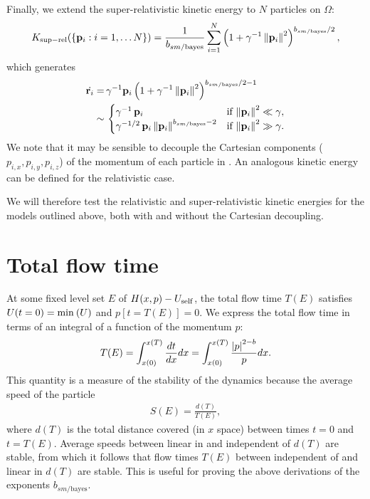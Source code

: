 \documentclass[a4paper]{article}
\begin{document}
Finally, we extend the super-relativistic kinetic energy to $N$ particles on $\Omega$:
\begin{align} \label{eq:RelKEManyParticles}
K_{\rm sup-rel}(\{ \mathbf{p}_i : i = 1, \dots N \}) = \frac{1}{b_{sm / \text{bayes}}} \sum_{i = 1}^N \left( 1 + \gamma^{-1} \left\lVert \mathbf{p}_i \right\rVert^2 \right)^{b_{sm / \text{bayes}} / 2} ,
\end{align}
which generates
\begin{align}
\dot{\mathbf{r}_i} =& \, \gamma^{-1} \mathbf{p}_i \left( 1 + \gamma^{-1} \left\lVert \mathbf{p}_i \right\rVert^2 \right)^{b_{sm / \text{bayes}} / 2 - 1} \nonumber \\
\sim & \,
\begin{cases} 
\gamma^{-1} \, \mathbf{p}_i &\text{if} \, \left\lVert \mathbf{p}_i \right\rVert^2 \ll \gamma , \\
\gamma^{-1 / 2} \, \mathbf{p}_i \left\lVert \mathbf{p}_i \right\rVert^{b_{sm / \text{bayes}} - 2} &\text{if} \, \left\lVert \mathbf{p}_i \right\rVert^2 \gg \gamma .
\end{cases} 
\end{align}
We note that it may be sensible to decouple the Cartesian components ($p_{i, x}, p_{i, y}, p_{i, z}$) of the momentum of each particle in . An analogous kinetic energy can be defined for the relativistic case. 

We will therefore test the relativistic and super-relativistic kinetic energies for the models outlined above, both with and without the Cartesian decoupling. 



\section{Total flow time}

At some fixed level set $E$ of $H(x, p) - U_{\rm{self}}$, the total flow time $T(E)$ satisfies $U(t = 0) = \min^{} \left( U \right)$ and $p[t = T(E)] = 0$. We express the total flow time in terms of an integral of a function of the momentum $p$:
\begin{align}
T(E) = \int_{x(0)}^{x(T)} \frac{dt}{dx} dx = \int_{x(0)}^{x(T)} \frac{\left| p \right|^{2 - b}}{p} dx .
\end{align}
This quantity is a measure of the stability of the dynamics because the average speed of the particle 
\begin{align}
S(E) = \frac{d(T)}{T(E)} ,
\end{align}
where $d(T)$ is the total distance covered (in $x$ space) between times $t = 0$ and $t = T(E)$. Average speeds between linear in and independent of $d(T)$ are stable, from which it follows that flow times $T(E)$ between independent of and linear in $d(T)$ are stable. This is useful for proving the above derivations of the exponents $b_{sm / \text{bayes}}$. 
\end{document}
